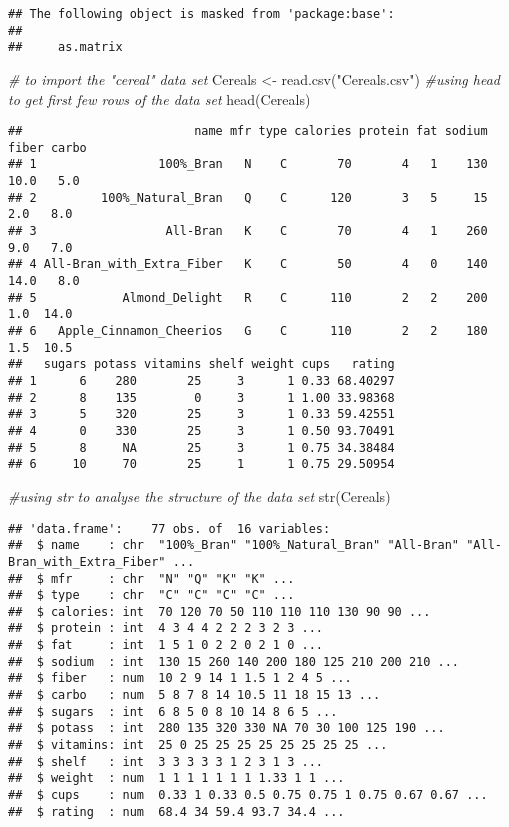 \documentclass[
]{article}
\newenvironment{Shaded}{\begin{snugshade}}{\end{snugshade}}
\newcommand{\CommentTok}[1]{\textcolor[rgb]{0.56,0.35,0.01}{\textit{#1}}}
\newcommand{\FunctionTok}[1]{\textcolor[rgb]{0.00,0.00,0.00}{#1}}
\newcommand{\NormalTok}[1]{#1}
\newcommand{\OtherTok}[1]{\textcolor[rgb]{0.56,0.35,0.01}{#1}}
\newcommand{\StringTok}[1]{\textcolor[rgb]{0.31,0.60,0.02}{#1}}
\begin{document}
\begin{verbatim}
## The following object is masked from 'package:base':
## 
##     as.matrix
\end{verbatim}

\begin{Shaded}
\begin{Highlighting}[]
\CommentTok{\# to import the "cereal" data set}
\NormalTok{Cereals }\OtherTok{\textless{}{-}} \FunctionTok{read.csv}\NormalTok{(}\StringTok{"Cereals.csv"}\NormalTok{)}
\CommentTok{\#using  head to get first few rows of the data set}
\FunctionTok{head}\NormalTok{(Cereals)}
\end{Highlighting}
\end{Shaded}

\begin{verbatim}
##                        name mfr type calories protein fat sodium fiber carbo
## 1                 100%_Bran   N    C       70       4   1    130  10.0   5.0
## 2         100%_Natural_Bran   Q    C      120       3   5     15   2.0   8.0
## 3                  All-Bran   K    C       70       4   1    260   9.0   7.0
## 4 All-Bran_with_Extra_Fiber   K    C       50       4   0    140  14.0   8.0
## 5            Almond_Delight   R    C      110       2   2    200   1.0  14.0
## 6   Apple_Cinnamon_Cheerios   G    C      110       2   2    180   1.5  10.5
##   sugars potass vitamins shelf weight cups   rating
## 1      6    280       25     3      1 0.33 68.40297
## 2      8    135        0     3      1 1.00 33.98368
## 3      5    320       25     3      1 0.33 59.42551
## 4      0    330       25     3      1 0.50 93.70491
## 5      8     NA       25     3      1 0.75 34.38484
## 6     10     70       25     1      1 0.75 29.50954
\end{verbatim}

\begin{Shaded}
\begin{Highlighting}[]
\CommentTok{\#using str to analyse the structure of the data set}
\FunctionTok{str}\NormalTok{(Cereals)}
\end{Highlighting}
\end{Shaded}

\begin{verbatim}
## 'data.frame':    77 obs. of  16 variables:
##  $ name    : chr  "100%_Bran" "100%_Natural_Bran" "All-Bran" "All-Bran_with_Extra_Fiber" ...
##  $ mfr     : chr  "N" "Q" "K" "K" ...
##  $ type    : chr  "C" "C" "C" "C" ...
##  $ calories: int  70 120 70 50 110 110 110 130 90 90 ...
##  $ protein : int  4 3 4 4 2 2 2 3 2 3 ...
##  $ fat     : int  1 5 1 0 2 2 0 2 1 0 ...
##  $ sodium  : int  130 15 260 140 200 180 125 210 200 210 ...
##  $ fiber   : num  10 2 9 14 1 1.5 1 2 4 5 ...
##  $ carbo   : num  5 8 7 8 14 10.5 11 18 15 13 ...
##  $ sugars  : int  6 8 5 0 8 10 14 8 6 5 ...
##  $ potass  : int  280 135 320 330 NA 70 30 100 125 190 ...
##  $ vitamins: int  25 0 25 25 25 25 25 25 25 25 ...
##  $ shelf   : int  3 3 3 3 3 1 2 3 1 3 ...
##  $ weight  : num  1 1 1 1 1 1 1 1.33 1 1 ...
##  $ cups    : num  0.33 1 0.33 0.5 0.75 0.75 1 0.75 0.67 0.67 ...
##  $ rating  : num  68.4 34 59.4 93.7 34.4 ...
\end{verbatim}
\end{document}
